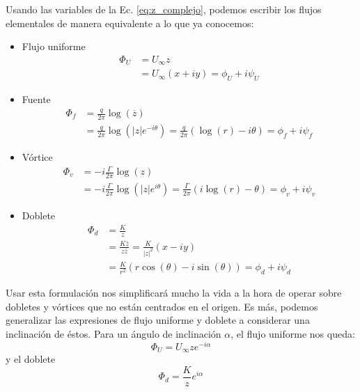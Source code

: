 Usando las variables de la Ec. \eqref{eq:z_complejo}, podemos escribir los flujos elementales de manera equivalente a lo que ya conocemos:
%
\begin{itemize}
\item Flujo uniforme
%
\begin{align}\label{eq:flujo_uniforme_complejo}
\Phi_U &= U_\infty z\nonumber\\
       &= U_\infty (x+iy) = \phi_U + i\psi_U
\end{align}
%
\item Fuente
%
\begin{align}\label{eq:fuente_complejo}
\Phi_f &= \frac{q}{2\pi} \log(\overline{z})\nonumber\\
       &= \frac{q}{2\pi} \log\left(|z|e^{-i\theta}\right) = \frac{q}{2\pi} \left(\log(r) - i\theta\right) = \phi_f + i\psi_f
\end{align}
%
\item Vórtice
%
\begin{align}\label{eq:vortice_complejo}
\Phi_v &= -i\frac{\Gamma}{2\pi} \log(z)\nonumber\\
       &= -i\frac{\Gamma}{2\pi} \log\left(|z|e^{i\theta}\right) = \frac{\Gamma}{2\pi} \left(i\log(r) - \theta\right) = \phi_v + i\psi_v
\end{align}
%
\item Doblete
%
\begin{align}\label{eq:doblete_complejo}
\Phi_d &= \frac{K}{z} \nonumber\\
       &= \frac{K\overline{z}}{z\overline{z}} = \frac{K}{|z|^2}(x-iy)\nonumber\\ 
       &= \frac{K}{r^2}(r\cos(\theta) - i\sin(\theta)) = \phi_d + i\psi_d
\end{align}

\end{itemize}

Usar esta formulación nos simplificará mucho la vida a la hora de operar sobre dobletes y vórtices que no están centrados en el origen.
Es más, podemos generalizar las expresiones de flujo uniforme y doblete a considerar una inclinación de éstos. 
Para un ángulo de inclinación $\alpha$, el flujo uniforme nos queda:
%
\begin{equation} \label{eq:flujo_uniforme_complejo_angulo}
\Phi_U = U_\infty z e^{-i\alpha}
\end{equation}
%
y el doblete
\begin{equation} \label{eq:doblete_complejo_angulo}
\Phi_d = \frac{K}{z}e^{i\alpha} 
\end{equation}
